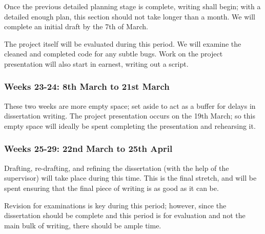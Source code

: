 \documentclass[12pt, a4paper, bibliography=totocnumbered]{scrartcl}
\begin{document}
Once the previous detailed planning stage is complete, writing shall begin; with a detailed enough plan, this section should not take longer than a month. We will complete an initial draft by the 7th of March.

The project itself will be evaluated during this period. We will examine the cleaned and completed code for any subtle bugs. Work on the project presentation will also start in earnest, writing out a script.

\subsubsection{Weeks 23-24: 8th March to 21st March}

These two weeks are more empty space; set aside to act as a buffer for delays in dissertation writing. The project presentation occurs on the 19th March; so this empty space will ideally be spent completing the presentation and rehearsing it.

\subsubsection{Weeks 25-29: 22nd March to 25th April}

Drafting, re-drafting, and refining the dissertation (with the help of the supervisor) will take place during this time. This is the final stretch, and will be spent ensuring that the final piece of writing is as good as it can be.

Revision for examinations is key during this period; however, since the dissertation should be complete and this period is for evaluation and not the main bulk of writing, there should be ample time.



\end{document}
